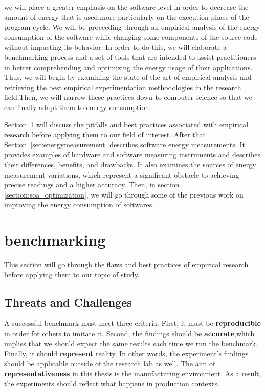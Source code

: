 we will place a greater emphasis on the software level in order to decrease the amount of energy that is used.more particularly on the execution phase of the program cycle.
We will be proceeding through an empirical analysis of the energy consumption of the software while changing some components of the source code without impacting its behavior.
In order to do this, we will elaborate a benchmarking process and a set of tools that are intended to assist practitioners in better comprehending and optimizing the energy usage of their applications.
Thus, we will begin by examining the state of the art of empirical analysis and retrieving the best empirical experimentation methodologies in the research field.Then, we will narrow these practices down to computer science so that we can finally adapt them to energy consumption.

Section~\ref{sec:soa_benchmarking} will discuss the pitfalls and best practices associated with empirical research before applying them to our field of interest.
After that Section~\ref{sec:energymeasurement} describes software energy measurements.
It provides examples of hardware and software measuring instruments and describes their differences, benefits, and drawbacks. It also examines the sources of energy measurement variations, which represent a significant obstacle to achieving precise readings and a higher accuracy.
Then, in section \ref{section:soa_optimization}, we will go through some of the previous work on improving the energy consumption of softwares.

\newpage
\section{benchmarking}\label{sec:soa_benchmarking}
This section will go through the flaws and best practices of empirical research before applying them to our topic of study.
\subsection{Threats and Challenges}

A successful benchmark must meet three criteria.
First, it must be \textbf{reproducible} in order for others to imitate it.
Second, the findings should be \textbf{accurate},which implies that we should expect the same results each time we run the benchmark.
Finally, it should \textbf{represent} reality.
In other words, the experiment's findings should be applicable outside of the research lab as well.
The aim of \textbf{representativeness} in this thesis is the manufacturing environment.
As a result, the experiments should reflect what happens in production contexts.

